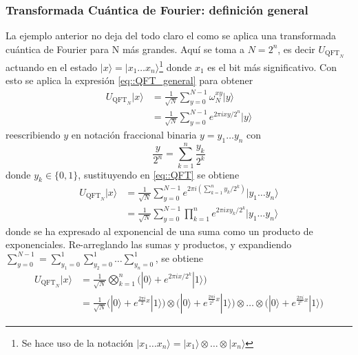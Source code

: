 \documentclass[a4paper]{article}
\begin{document}
\subsubsection{Transformada Cuántica de Fourier: definición general}
La ejemplo anterior no deja del todo claro el como se aplica una transformada cuántica de Fourier para N más grandes. Aquí se toma a $N=2^n$, es decir $U_{\text{QFT}_N}$ actuando en el estado $|x\rangle=|x_1\hdots x_n\rangle$\footnote{Se hace uso de la notación $|x_1\hdots x_n\rangle=|x_1\rangle\otimes\hdots\otimes |x_n\rangle$ } donde $x_1$ es el bit más significativo. Con esto se aplica la expresión \ref{eq::QFT_general} para obtener
\begin{equation}\label{eq::QFT}
\begin{aligned}
U_{\text{QFT}_N}|x\rangle &=\frac{1}{\sqrt{N}}\sum_{y=0}^{N-1}\omega_N^{xy}|y\rangle\\
&=\frac{1}{\sqrt{N}}\sum_{y=0}^{N-1} e^{2\pi i xy/2^{n}}|y\rangle
\end{aligned}
\end{equation}
reescribiendo $y$ en notación fraccional binaria $y=y_1\hdots y_n$ con
\begin{equation*}
\frac{y}{2^n}=\sum_{k=1}^{n}\frac{y_k}{2^k}
\end{equation*}
donde $y_k \in\{ 0, 1 \}$, sustituyendo en \ref{eq::QFT} se obtiene
\begin{equation}\label{eq::QFT_2}
\begin{aligned}
U_{\text{QFT}_N}|x\rangle &=\frac{1}{\sqrt{N}}\sum_{y=0}^{N-1}e^{2\pi i(\sum_{k=1}^n y_k/2^k)}|y_1 \hdots y_n\rangle\\
&=\frac{1}{\sqrt{N}}\sum_{y=0}^{N-1} \prod_{k=1}^n e^{2\pi i x y_k/2^{k}}|y_1 \hdots y_n\rangle
\end{aligned}
\end{equation}
donde se ha expresado al exponencial de una suma como un producto de exponenciales. Re-arreglando las sumas y productos, y expandiendo $\sum_{y=0}^{N-1}=\sum_{y_1=0}^1 \sum_{y_2=0}^1 \hdots \sum_{y_n=0}^1$, se obtiene
\begin{equation}\label{eq::QFT_3}
\begin{aligned}
U_{\text{QFT}_N}|x\rangle &=\frac{1}{\sqrt{N}} \bigotimes_{k=1}^n \bigg(|0\rangle + e^{2\pi i x/2^k}|1\rangle \bigg)  \\
&=\frac{1}{\sqrt{N}}\bigg(|0\rangle + e^{\frac{2\pi i}{2} x} |1\rangle \bigg)\otimes\bigg(|0\rangle + e^{\frac{2\pi i}{2^2} x} |1\rangle \bigg)\otimes \hdots \otimes \bigg(|0\rangle + e^{\frac{2\pi i}{2^{n}} x} |1\rangle \bigg)
\end{aligned}
\end{equation}
\end{document}
